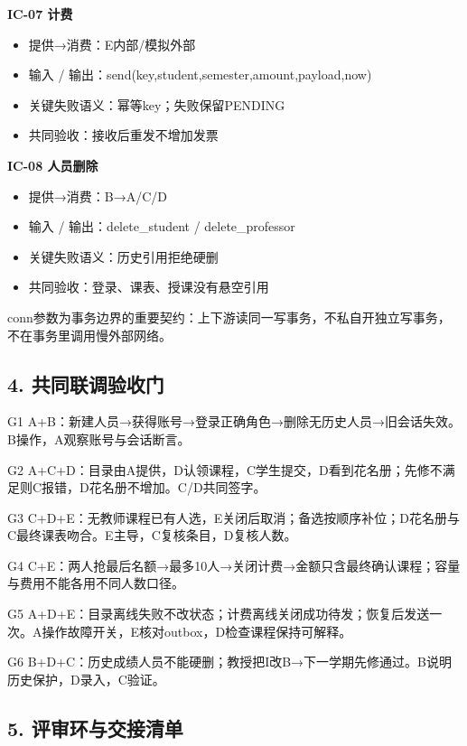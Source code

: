 \documentclass[UTF8,11pt,a4paper]{ctexart}
\providecommand{\tightlist}{\setlength{\itemsep}{0pt}\setlength{\parskip}{0pt}}
\begin{document}
\textbf{IC-07 计费}

\begin{itemize}
\tightlist
\item
  提供→消费：E内部/模拟外部
\item
  输入 / 输出：send(key,student,semester,amount,payload,now)
\item
  关键失败语义：幂等key；失败保留PENDING
\item
  共同验收：接收后重发不增加发票
\end{itemize}

\textbf{IC-08 人员删除}

\begin{itemize}
\tightlist
\item
  提供→消费：B→A/C/D
\item
  输入 / 输出：delete\_\allowbreak{}student / delete\_\allowbreak{}professor
\item
  关键失败语义：历史引用拒绝硬删
\item
  共同验收：登录、课表、授课没有悬空引用
\end{itemize}

conn参数为事务边界的重要契约：上下游读同一写事务，不私自开独立写事务，不在事务里调用慢外部网络。

\hypertarget{4-ux5171ux540cux8054ux8c03ux9a8cux6536ux95e8}{%
\subsection{4.
共同联调验收门}\label{4-ux5171ux540cux8054ux8c03ux9a8cux6536ux95e8}}

G1
A+B：新建人员→获得账号→登录正确角色→删除无历史人员→旧会话失效。B操作，A观察账号与会话断言。

G2
A+C+D：目录由A提供，D认领课程，C学生提交，D看到花名册；先修不满足则C报错，D花名册不增加。C/D共同签字。

G3
C+D+E：无教师课程已有人选，E关闭后取消；备选按顺序补位；D花名册与C最终课表吻合。E主导，C复核条目，D复核人数。

G4
C+E：两人抢最后名额→最多10人→关闭计费→金额只含最终确认课程；容量与费用不能各用不同人数口径。

G5
A+D+E：目录离线失败不改状态；计费离线关闭成功待发；恢复后发送一次。A操作故障开关，E核对outbox，D检查课程保持可解释。

G6
B+D+C：历史成绩人员不能硬删；教授把I改B→下一学期先修通过。B说明历史保护，D录入，C验证。

\hypertarget{5-ux8bc4ux5ba1ux73afux4e0eux4ea4ux63a5ux6e05ux5355}{%
\subsection{5.
评审环与交接清单}\label{5-ux8bc4ux5ba1ux73afux4e0eux4ea4ux63a5ux6e05ux5355}}
\end{document}
